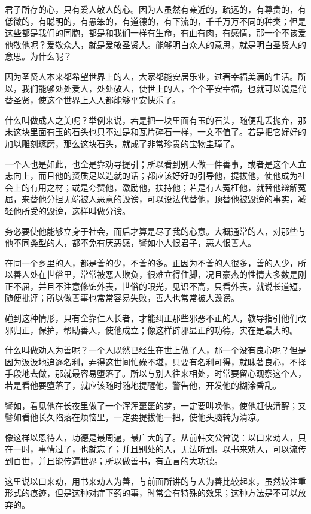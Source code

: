 \documentclass[12pt,twoside,openany]{book}
\begin{document}
君子所存的心，只有爱人敬人的心。因为人虽然有亲近的，疏远的，有尊贵的，有低微的，有聪明的，有愚笨的，有道德的，有下流的，千千万万不同的种类；但是这些都是我们的同胞，都是和我们一样有生命，有血有肉，有感情，那一个不该爱他敬他呢？爱敬众人，就是爱敬圣贤人。能够明白众人的意思，就是明白圣贤人的意思。为什么呢？

因为圣贤人本来都希望世界上的人，大家都能安居乐业，过著幸福美满的生活。所以，我们能够处处爱人，处处敬人，使世上的人，个个平安幸福，也就可以说是代替圣贤，使这个世界上人人都能够平安快乐了。

什么叫做成人之美呢？举例来说，若是把一块里面有玉的石头，随便乱丢抛弃，那末这块里面有玉的石头也只不过是和瓦片碎石一样，一文不值了。若是把它好好的加以雕刻琢磨，那么这块石头，就成了非常珍贵的宝物圭璋了。

一个人也是如此，也全是靠劝导提引；所以看到别人做一件善事，或者是这个人立志向上，而且他的资质足以造就的话；都应该好好的引导他，提拔他，使他成为社会上的有用之材；或是夸赞他，激励他，扶持他；若是有人冤枉他，就替他辩解冤屈，来替他分担无端被人恶意的毁谤，可以设法代替他，顶替他被毁谤的事实，减轻他所受的毁谤，这样叫做分谤。

务必要使他能够立身于社会，而后才算是尽了我的心意。大概通常的人，对那些与他不同类型的人，都不免有厌恶感，譬如小人恨君子，恶人恨善人。

在同一个乡里的人，都是善的少，不善的多。正因为不善的人很多，善的人少，所以善人处在世俗里，常常被恶人欺负，很难立得住脚，况且豪杰的性情大多数是刚正不屈，并且不注意修饰外表，世俗的眼光，见识不高，只看外表，就说长道短，随便批评；所以做善事也常常容易失败，善人也常常被人毁谤。

碰到这种情形，只有全靠仁人长者，才能纠正那些邪恶不正的人，教导指引他们改邪归正，保护，帮助善人，使他成立；像这样辟邪显正的功德，实在是最大的。

什么叫做劝人为善呢？一个人既然已经生在世上做了人，那一个没有良心呢？但是因为汲汲地追逐名利，弄得这世间忙碌不堪，只要有名利可得，就昧著良心，不择手段地去做，那就最容易堕落了。所以与别人往来相处，时常要留心观察这个人，若是看他要堕落了，就应该随时随地提醒他，警告他，开发他的糊涂昏乱。

譬如，看见他在长夜里做了一个浑浑噩噩的梦，一定要叫唤他，使他赶快清醒；又譬如看他长久陷落在烦恼里，一定要提拔他一把，使他头脑转为清凉。

像这样以恩待人，功德是最周遍，最广大的了。从前韩文公曾说：以口来劝人，只在一时，事情过了，也就忘了；并且别处的人，无法听到。以书来劝人，可以流传到百世，并且能传遍世界；所以做善书，有立言的大功德。

这里说以口来劝，用书来劝人为善，与前面所讲的与人为善比较起来，虽然较注重形式的痕迹，但是这种对症下药的事，时常会有特殊的效果；这种方法是不可以放弃的。
\end{document}
